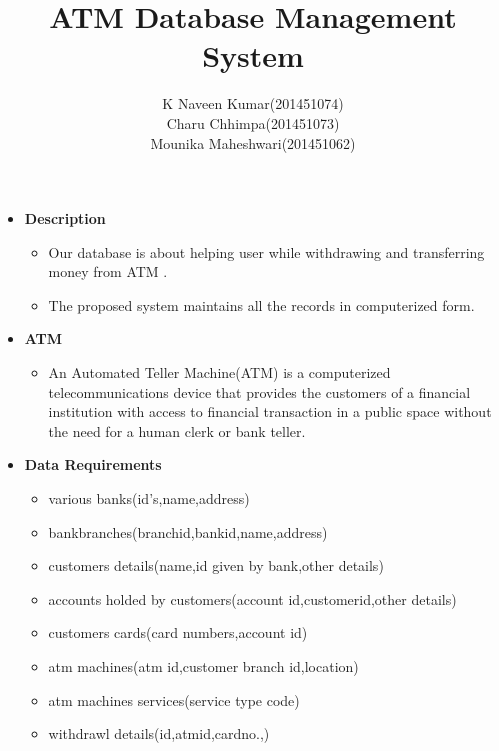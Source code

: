 \documentclass[12pt]{article}
\begin{document}
\title{ATM Database Management System}
\author{K Naveen Kumar(201451074)\\Charu Chhimpa(201451073)\\Mounika Maheshwari(201451062)}
\maketitle


\begin{itemize}

\item \textbf{Description}

\begin{itemize}



\item  Our database is about helping user while withdrawing and transferring money from ATM .
\item The proposed system maintains all the records in computerized form.

\end{itemize}


\item \textbf{ATM} 

\begin{itemize}
\item An Automated Teller Machine(ATM) is a computerized telecommunications device that provides the customers of a financial institution with access to financial transaction in a public space without the need for a human clerk or bank teller.
\end{itemize}

\item \textbf{Data Requirements}
\begin{itemize}
\item various banks(id's,name,address)
\item bankbranches(branchid,bankid,name,address)
\item customers details(name,id given by bank,other details)
\item accounts holded by customers(account id,customerid,other details)
\item customers cards(card numbers,account id)
\item atm machines(atm id,customer branch id,location)
\item atm machines services(service type code)
\item withdrawl details(id,atmid,cardno.,)
\end{itemize}


\end{itemize}
\end{document}
